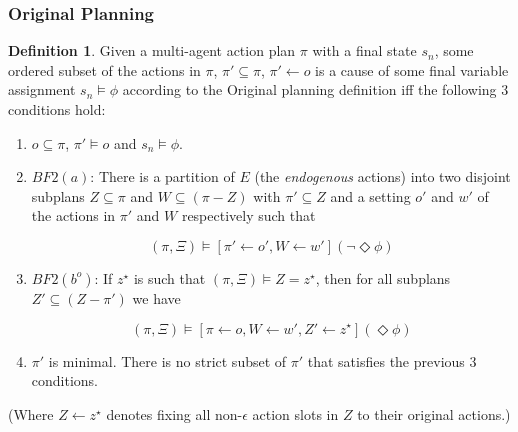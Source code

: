 \documentclass{article}
\theoremstyle{plain}
\theoremstyle{definition}
\newtheorem{defn}[thm]{Definition} %
\begin{document}
\subsubsection*{Original Planning}
\begin{defn}
Given a multi-agent action plan $\pi$ with a final state $s_n$, some ordered subset of the actions in $\pi$, $\pi' \subseteq \pi$, $\pi' \leftarrow o$ is a cause of some final variable assignment $s_n \models \phi$ according to the Original planning definition iff the following 3 conditions hold:
\begin{enumerate}
\item  $o \subseteq \pi$, $\pi' \models o$ and $s_n \models \phi$.



\item $BF2(a)$: There is a partition of $E$ (the \textit{endogenous} actions) into two disjoint subplans $Z \subseteq \pi$ and $W \subseteq (\pi - Z)$ with $\pi' \subseteq Z$ and a setting $o'$ and $w'$ of the actions in $\pi'$ and $W$ respectively such that

\[
(\pi, \Xi) \models [\pi' \leftarrow o', W \leftarrow w'](\lnot \Diamond \phi)
\]

\item $BF2(b^o)$: If $z^\star$ is such that $(\pi, \Xi) \models Z = z^\star$, then for all subplans $Z' \subseteq (Z - \pi')$ we have

\[
(\pi, \Xi) \models [\pi \leftarrow o, W \leftarrow w', Z' \leftarrow z^\star](\Diamond \phi)
\]

\item $\pi'$ is minimal. There is no strict subset of $\pi'$ that satisfies the previous 3 conditions.
\end{enumerate}
\end{defn}

(Where $Z\leftarrow z^\star$ denotes fixing all non-$\epsilon$ action slots in $Z$ to their original actions.)
\end{document}
